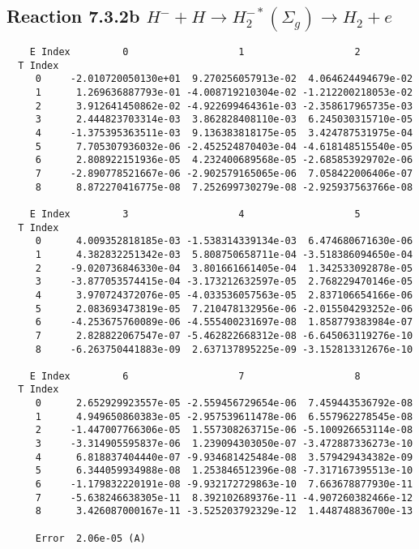 \documentclass[12pt]{article}
\begin{document}
                               


\newpage
\subsection{
Reaction 7.3.2b $  H^- + H \rightarrow H_2^{-*}(\Sigma_g) \rightarrow H_2 + e$}


\begin{small}\begin{verbatim}
    E Index         0                   1                   2
  T Index
     0     -2.010720050130e+01  9.270256057913e-02  4.064624494679e-02
     1      1.269636887793e-01 -4.008719210304e-02 -1.212200218053e-02
     2      3.912641450862e-02 -4.922699464361e-03 -2.358617965735e-03
     3      2.444823703314e-03  3.862828408110e-03  6.245030315710e-05
     4     -1.375395363511e-03  9.136383818175e-05  3.424787531975e-04
     5      7.705307936032e-06 -2.452524870403e-04 -4.618148515540e-05
     6      2.808922151936e-05  4.232400689568e-05 -2.685853929702e-06
     7     -2.890778521667e-06 -2.902579165065e-06  7.058422006406e-07
     8      8.872270416775e-08  7.252699730279e-08 -2.925937563766e-08

    E Index         3                   4                   5
  T Index
     0      4.009352818185e-03 -1.538314339134e-03  6.474680671630e-06
     1      4.382832251342e-03  5.808750658711e-04 -3.518386094650e-04
     2     -9.020736846330e-04  3.801661661405e-04  1.342533092878e-05
     3     -3.877053574415e-04 -3.173212632597e-05  2.768229470146e-05
     4      3.970724372076e-05 -4.033536057563e-05  2.837106654166e-06
     5      2.083693473819e-05  7.210478132956e-06 -2.015504293252e-06
     6     -4.253675760089e-06 -4.555400231697e-08  1.858779383984e-07
     7      2.828822067547e-07 -5.462822668312e-08 -6.645063119276e-10
     8     -6.263750441883e-09  2.637137895225e-09 -3.152813312676e-10

    E Index         6                   7                   8
  T Index
     0      2.652929923557e-05 -2.559456729654e-06  7.459443536792e-08
     1      4.949650860383e-05 -2.957539611478e-06  6.557962278545e-08
     2     -1.447007766306e-05  1.557308263715e-06 -5.100926653114e-08
     3     -3.314905595837e-06  1.239094303050e-07 -3.472887336273e-10
     4      6.818837404440e-07 -9.934681425484e-08  3.579429434382e-09
     5      6.344059934988e-08  1.253846512396e-08 -7.317167395513e-10
     6     -1.179832220191e-08 -9.932172729863e-10  7.663678877930e-11
     7     -5.638246638305e-11  8.392102689376e-11 -4.907260382466e-12
     8      3.426087000167e-11 -3.525203792329e-12  1.448748836700e-13

     Error  2.06e-05 (A)
\end{verbatim}\end{small}
\end{document}
